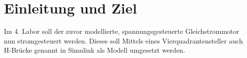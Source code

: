 \section{Einleitung und Ziel}

Im 4. Labor soll der zuvor modellierte, spannungsgesteuerte
Gleichstrommotor nun stromgesteuert werden. Dieses soll Mittels
eines Vierquadrantensteller auch H-Brücke genannt in Simulink
als Modell umgesetzt werden.














